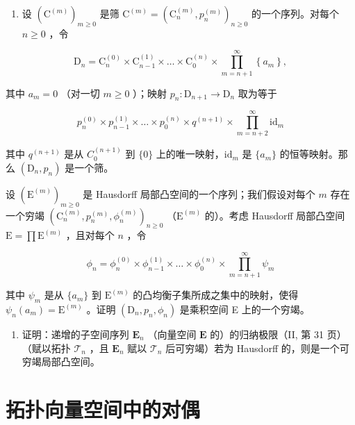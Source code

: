 \begin{enumerate}
\def\labelenumi{\arabic{enumi})}
\setcounter{enumi}{4}
\tightlist
\item
  设 \((\mathrm{C}^{(m)})_{m\geqslant 0}\) 是筛 \(\mathrm{C}^{(m)} = (\mathrm{C}_n^{(m)},p_n^{(m)})_{n\geqslant 0}\) 的一个序列。对每个 \(n\geqslant 0\) ，令
\end{enumerate}

\[
\mathrm{D} _ {n} = \mathrm{C} _ {n} ^ {(0)} \times \mathrm{C} _ {n - 1} ^ {(1)} \times \dots \times \mathrm{C} _ {0} ^ {(n)} \times \prod_ {m = n + 1} ^ {\infty} \left\{a _ {m} \right\},
\]

其中 \(a_{m} = 0\) （对一切 \(m\geqslant 0\) ）；映射 \(p_n:\mathrm{D}_{n + 1}\to \mathrm{D}_n\) 取为等于

\[
p _ {n} ^ {(0)} \times p _ {n - 1} ^ {(1)} \times \dots \times p _ {0} ^ {(n)} \times q ^ {(n + 1)} \times \prod_ {m = n + 2} ^ {\infty} \mathrm{id} _ {m}
\]

其中 \(q^{(n + 1)}\) 是从 \(C_0^{(n + 1)}\) 到 \(\{0\}\) 上的唯一映射，\(\mathrm{id}_m\) 是 \(\{a_m\}\) 的恒等映射。那么 \((\mathrm{D}_n, p_n)\) 是一个筛。

设 \((\mathrm{E}^{(m)})_{m\geqslant 0}\) 是 Hausdorff 局部凸空间的一个序列；我们假设对每个 \(m\) 存在一个穷竭 \((\mathrm{C}_n^{(m)},p_n^{(m)},\phi_n^{(m)})_{n\geqslant 0}\) （\(\mathrm{E}^{(m)}\) 的）。考虑 Hausdorff 局部凸空间 \(\mathrm{E} = \prod \mathrm{E}^{(m)}\) ，且对每个 \(n\) ，令

\[
\phi_ {n} = \phi_ {n} ^ {(0)} \times \phi_ {n - 1} ^ {(1)} \times \dots \times \phi_ {0} ^ {(n)} \times \prod_ {m = n + 1} ^ {\infty} \psi_ {m}
\]

其中 \(\psi_{m}\) 是从 \(\{a_m\}\) 到 \(\mathrm{E}^{(m)}\) 的凸均衡子集所成之集中的映射，使得 \(\psi_{n}(a_{m}) = \mathrm{E}^{(m)}\) 。证明 \((\mathrm{D}_n,p_n,\phi_n)\) 是乘积空间 E 上的一个穷竭。

\begin{enumerate}
\def\labelenumi{\arabic{enumi})}
\setcounter{enumi}{5}
\tightlist
\item
  证明：递增的子空间序列 \(\mathbf{E}_n\) （向量空间 \(\mathbf{E}\) 的）的归纳极限（II, 第 31 页）（赋以拓扑 \(\mathcal{T}_n\) ，且 \(\mathbf{E}_n\) 赋以 \(\mathcal{T}_n\) 后可穷竭）若为 Hausdorff 的，则是一个可穷竭局部凸空间。
\end{enumerate}

\chapter{拓扑向量空间中的对偶}

